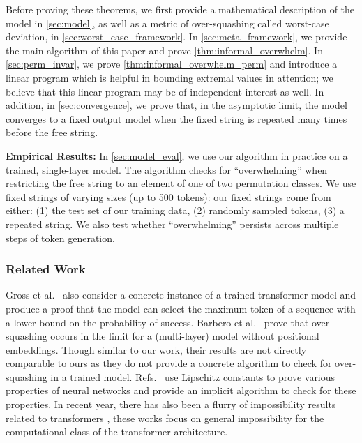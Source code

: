 Before proving these theorems, we first provide a mathematical description of the model in \cref{sec:model}, as well as a metric of over-squashing called worst-case deviation, in \cref{sec:worst_case_framework}.
In \cref{sec:meta_framework}, we provide the main algorithm of this paper and prove \cref{thm:informal_overwhelm}.
In \cref{sec:perm_invar}, we prove \cref{thm:informal_overwhelm_perm} and introduce a linear program which is helpful in bounding extremal values in attention; we believe that this linear program may be of independent interest as well.
In addition, in \cref{sec:convergence}, we prove that, in the asymptotic limit, the model converges to a fixed output model when the fixed string is repeated many times before the free string.

\textbf{Empirical Results:} In \cref{sec:model_eval}, we use our algorithm in practice on a trained, single-layer model.
The algorithm checks for ``overwhelming'' when restricting the free string to an element of one of two permutation classes.
We use fixed strings of varying sizes (up to 500 tokens): our fixed strings come from either: (1) the test set of our training data, (2) randomly sampled tokens, (3) a repeated string.
We also test whether ``overwhelming'' persists across multiple steps of token generation.

\subsubsection*{Related Work}
Gross et al.~\cite{gross2024compact} also consider a concrete instance of a trained transformer model and produce a proof that the model can select the maximum token of a sequence with a lower bound on the probability of success.
Barbero et al.~\cite{barbero2024transformers} prove that over-squashing occurs in the limit for a (multi-layer) model without positional embeddings.
Though similar to our work, their results are not directly comparable to ours as they do not provide a concrete algorithm to check for over-squashing in a trained model.
Refs.~\cite{hahn2020theoretical, hahn2024sensitive} use Lipschitz constants to prove various properties of neural networks and provide an implicit algorithm to check for these properties.
In recent year, there has also been a flurry of impossibility results related to transformers \cite{peng2024limitations, merrill2023parallelism, sanford2024representational}, these works focus on general impossibility for the computational class of the transformer architecture.
\iffalse
